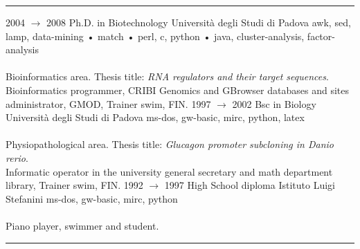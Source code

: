 \documentclass[9pt]{stackoverflow} %
\begin{document}
\textcolor{stackoverflow}{\hrule}
\vspace{4pt} %
\begin{tcolorbox}[blanker,width=0.75\textwidth,enlarge left by=0.25\textwidth,before skip=6pt,breakable,
	overlay unbroken and first={%
	  \node[inner sep=0pt,outer sep=0pt,text width=0.35\textwidth,
		align=none,
		below right]
		at ([xshift=-0.25\textwidth]frame.north west)
{
	\vspace{\baselineskip} %
	\cvsect{Education}
};}]
{\vspace{-16.3pt} %
	\small\begin{entrylist}
	\entry
		{2004 $\rightarrow$ 2008}
		{Ph.D. in Biotechnology}
		{Università degli Studi di Padova}
		{{awk, sed, lamp, data-mining	• match	• perl, c, python	• java, cluster-analysis, factor-analysis}\\\\
		Bioinformatics area. Thesis title: \emph{RNA regulators and their target sequences}.\\
		Bioinformatics programmer, CRIBI Genomics and GBrowser databases and sites administrator, GMOD, Trainer swim, FIN.}
	\entry
		{1997 $\rightarrow$ 2002}
		{Bsc in Biology}
		{Università degli Studi di Padova}
		{{ms-dos, gw-basic, mirc, python, latex}\\\\
		Physiopathological area. Thesis title: \emph{Glucagon promoter subcloning in Danio rerio}.\\
		Informatic operator in the university general secretary and math department library, Trainer swim, FIN.}
	\entry
		{1992 $\rightarrow$ 1997}
		{High School diploma}
		{Istituto Luigi Stefanini}
		{{ms-dos, gw-basic, mirc, python}\\\\
		Piano player, swimmer and student.}
	\end{entrylist}}
\end{tcolorbox}


\textcolor{stackoverflow}{\hrule}
\begin{minipage}[t]{0.25\textwidth}
	\vspace{\baselineskip} %
\end{minipage}
\begin{minipage}[t]{0.75\textwidth}
	\vspace{\baselineskip} %
	{\small
	}
\end{minipage}
\end{document}
